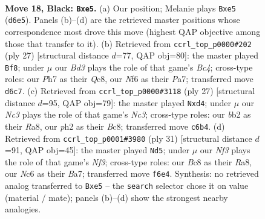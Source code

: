 \documentclass[11pt]{article}
\begin{document}
\clearpage

\begin{figure}[p]\centering
\begin{subfigure}{0.46\textwidth}\centering
\resizebox{\linewidth}{!}{%
\newchessgame
\chessboard[
  setfen={2br4/1p2qpkp/r1nb1np1/p3P1Q1/P7/1P3NP1/1B3PBP/RN2R1K1 b - - 0 18},
  showmover=false,
  pgfstyle=straightmove, color=movearrow, markmove={d6-e5}
]}
\caption{}
\end{subfigure}\hfill
\begin{subfigure}{0.46\textwidth}\centering
\resizebox{\linewidth}{!}{%
\newchessgame
\chessboard[
  setfen={r1qr2k1/pb3ppp/1pn1p3/2bn4/QP6/P4NP1/3BPPBP/RN2R1K1 b - - 0 14},
  showmover=false,
  pgfstyle=straightmove, color=movearrow, markmove={c5-f8}
]}
\caption{}
\end{subfigure}
\\[4pt]
\begin{subfigure}{0.46\textwidth}\centering
\resizebox{\linewidth}{!}{%
\newchessgame
\chessboard[
  setfen={r1bq1rk1/1p3ppp/p1n2n2/2b5/3P4/1QN3P1/PP1BNPBP/R4RK1 b - - 0 14},
  showmover=false,
  pgfstyle=straightmove, color=movearrow, markmove={c6-d4}
]}
\caption{}
\end{subfigure}\hfill
\begin{subfigure}{0.46\textwidth}\centering
\resizebox{\linewidth}{!}{%
\newchessgame
\chessboard[
  setfen={r4rk1/bb2qppp/p1n1pn2/1p6/1P4PQ/P3PN2/1B2NPBP/R3K2R b KQ - 2 16},
  showmover=false,
  pgfstyle=straightmove, color=movearrow, markmove={f6-d5}
]}
\caption{}
\end{subfigure}
\caption{\textbf{Move 18, Black: \texttt{Bxe5}.} (a) Our position; Melanie plays \texttt{Bxe5} (\texttt{d6e5}). Panels (b)--(d) are the retrieved master positions whose correspondence most drove this move (highest QAP objective among those that transfer to it). (b) Retrieved from \texttt{ccrl\_top\_p0000\#202} (ply 27) [structural distance $d$=77, QAP obj=80]: the master played \texttt{Bf8}; under $\mu$ our \emph{Bd3} plays the role of that game's \emph{Bc4}; cross-type roles: our \emph{P}h7 as their \emph{Q}c8, our \emph{N}f6 as their \emph{P}a7; transferred move \texttt{d6c7}. (c) Retrieved from \texttt{ccrl\_top\_p0000\#3118} (ply 27) [structural distance $d$=95, QAP obj=79]: the master played \texttt{Nxd4}; under $\mu$ our \emph{Nc3} plays the role of that game's \emph{Nc3}; cross-type roles: our \emph{b}b2 as their \emph{R}a8, our \emph{p}h2 as their \emph{B}c8; transferred move \texttt{c6b4}. (d) Retrieved from \texttt{ccrl\_top\_p0001\#3980} (ply 31) [structural distance $d$=91, QAP obj=45]: the master played \texttt{Nd5}; under $\mu$ our \emph{Nf3} plays the role of that game's \emph{Nf3}; cross-type roles: our \emph{B}c8 as their \emph{R}a8, our \emph{N}c6 as their \emph{B}a7; transferred move \texttt{f6e4}. Synthesis: no retrieved analog transferred to \texttt{Bxe5} -- the \texttt{search} selector chose it on value (material / mate); panels (b)--(d) show the strongest nearby analogies.}
\label{fig:thought-m35}
\end{figure}
\end{document}
